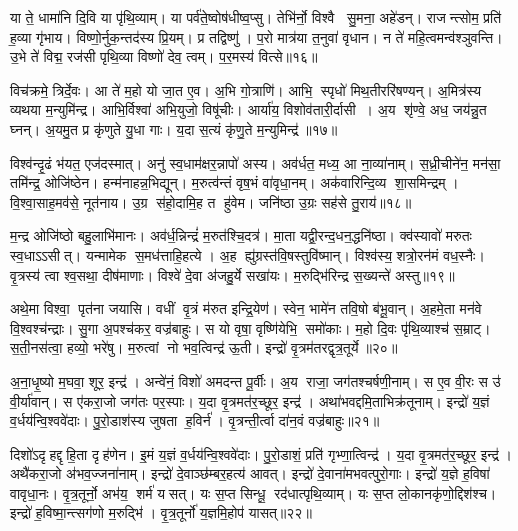 या ते॒ धामा॑नि दि॒वि या पृ॑थि॒व्याम्।
या पर्व॑ते॒ष्वोष॑धीष्व॒प्सु।
तेभि॑र्नो॒ विश्वै सु॒मना॒ अहे॑डन्।
राजन्त्सोम॒ प्रति॑ ह॒व्या गृ॑भाय।
विष्णो॒र्नुक॒न्तद॑स्य प्रि॒यम्।
प्र तद्विष्णु॑।
प॒रो मात्र॑या त॒नुवा॑ वृधान।
न ते॑ महि॒त्वमन्व॑श्ञुवन्ति।
उ॒भे ते॑ विद्म॒ रज॑सी पृथि॒व्या विष्णो॑ देव॒ त्वम्।
प॒र॒मस्य॑ वित्से॥१६॥

विच॑क्रमे॒ त्रिर्दे॒वः।
आ ते॑ म॒हो यो जा॒त ए॒व।
अ॒भि गो॒त्राणि॑।
आभि॒ स्पृधो॑ मिथ॒तीररि॑षण्यन्।
अ॒मित्र॑स्य व्यथया म॒न्युमि॑न्द्र।
आभि॒र्विश्वा॑ अभि॒युजो॒ विषू॑चीः।
आर्या॑य॒ विशोव॑तारी॒र्दासी।
अ॒य शृ॑ण्वे॒ अध॒ जय॑न्नु॒त घ्नन्।
अ॒यमु॒त प्र कृ॑णुते यु॒धा गाः।
य॒दा स॒त्यं कृ॑णु॒ते म॒न्युमिन्द्र॑॥१७॥

विश्व॑न्दृ॒ढं भ॑यत॒ एज॑दस्मात्।
अनु॑ स्व॒धाम॑क्षर॒न्नापो॑ अस्य।
अव॑र्धत॒ मध्य॒ आ ना॒व्या॑नाम्।
स॒ध्री॒चीने॑न॒ मन॑सा॒ तमि॑न्द्र॒ ओजि॑ष्ठेन।
हन्म॑नाहन्न॒भिद्यून्।
म॒रुत्व॑न्तं वृष॒भं वा॑वृधा॒नम्।
अक॑वारिन्दि॒व्य शा॒समिन्द्रम्।
वि॒श्वा॒साह॒मव॑से॒ नूत॑नाय।
उ॒ग्र स॑हो॒दामि॒ह त हु॑वेम।
जनि॑ष्ठा उ॒ग्रः सह॑से तु॒राय॑॥१८॥

म॒न्द्र ओजि॑ष्ठो बहु॒लाभि॑मानः।
अव॑र्ध॒न्निन्द्रं॑ म॒रुत॑श्चि॒दत्र॑।
मा॒ता यद्वी॒रन्द॒धन॒द्धनि॑ष्ठा।
क्व॑स्यावो॑ मरुतः स्व॒धाऽऽसीत्।
यन्मामेक स॒मध॑त्ताहि॒हत्ये।
अ॒ह ह्यु॑ग्रस्त॑वि॒षस्तुवि॑ष्मान्।
विश्व॑स्य॒ शत्रो॒रन॑मं वध॒स्नैः।
वृ॒त्रस्य॑ त्वा श्व॒सथा॒ दीष॑माणाः।
विश्वे॑ दे॒वा अ॑जहु॒र्ये सखा॑यः।
म॒रुद्भि॑रिन्द्र स॒ख्यन्ते॑ अस्तु॥१९॥

अथे॒मा विश्वा॒ पृत॑ना जयासि।
वधीं वृ॒त्रं म॑रुत इन्द्रि॒येण॑।
स्वेन॒ भामे॑न तवि॒षो ब॑भू॒वान्।
अ॒हमे॒ता मन॑वे वि॒श्वश्च॑न्द्राः।
सु॒गा अ॒पश्च॑कर॒ वज्र॑बाहुः।
स यो वृषा॒ वृष्णि॑येभि॒ समो॑काः।
म॒हो दि॒वः पृ॑थि॒व्याश्च॑ स॒म्राट्।
स॒ती॒नस॑त्वा॒ हव्यो॒ भरे॑षु।
म॒रुत्वां नो भव॒त्विन्द्र॑ ऊ॒ती।
इन्द्रो॑ वृ॒त्रम॑तरद्वृत्र॒तूर्ये॥२०॥

अ॒ना॒धृ॒ष्यो म॒घवा॒ शूर॒ इन्द्र॑।
अन्वे॑नं॒ विशो॑ अमदन्त पू॒र्वीः।
अ॒य राजा॒ जग॑तश्चर्\mbox{}षणी॒नाम्।
स ए॒व वी॒रः स उ॑ वी॒र्या॑वान्।
स ए॑करा॒जो जग॑तः पर॒स्पाः।
य॒दा वृ॒त्रमत॑र॒च्छूर॒ इन्द्र॑।
अथा॑भवद्दमि॒ताभिक्र॑तूनाम्।
इन्द्रो॑ य॒ज्ञं व॒र्धय॑न्वि॒श्ववे॑दाः।
पु॒रो॒डाश॑स्य जुषता ह॒विर्न॑।
वृ॒त्रन्ती॒र्त्वा दा॑न॒वं वज्र॑बाहुः॥२१॥

दिशो॑ऽदृहद्दृहि॒ता दृह॑णेन।
इ॒मं य॒ज्ञं व॒र्धय॑न्वि॒श्ववे॑दाः।
पु॒रो॒डाशं॒ प्रति॑ गृभ्णा॒त्विन्द्र॑।
य॒दा वृ॒त्रमत॑र॒च्छूर॒ इन्द्र॑।
अथै॑करा॒जो अ॑भव॒ज्जना॑नाम्।
इन्द्रो॑ दे॒वाञ्छ॑म्बर॒हत्य॑ आवत्।
इन्द्रो॑ दे॒वाना॑मभवत्पुरो॒गाः।
इन्द्रो॑ य॒ज्ञे ह॒विषा॑ वावृधा॒नः।
वृ॒त्र॒तूर्नो॒ अभ॑य॒ शर्म॑ यसत्।
यः स॒प्त सिन्धू॒ रद॑धात्पृथि॒व्याम्।
यः स॒प्त लो॒कानकृ॑णो॒द्दिश॑श्च।
इन्द्रो॑ ह॒विष्मा॒न्त्सग॑णो म॒रुद्भि॑।
वृ॒त्र॒तूर्नो॑ य॒ज्ञमि॒होप॑ यासत्॥२२॥\anuvakamend[व॒व॒र्थ॒ वि॒त्स॒ इन्द्र॑स्तु॒रायास्तु वृत्र॒तूर्ये॒ वज्र॑बाहुः पृथि॒व्यान्त्रीणि॑ च]

